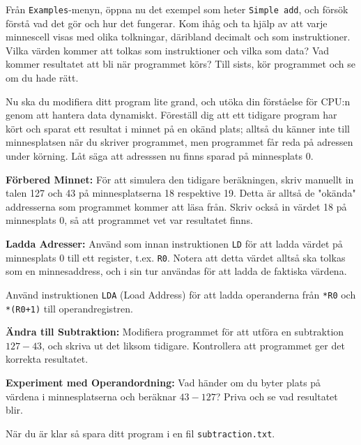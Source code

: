 \begin{Datorarbete}
    \item {} Från \texttt{Examples}-menyn, öppna nu det exempel som heter \texttt{Simple~add}, och försök förstå vad det gör och hur det fungerar. Kom ihåg och ta hjälp av att varje minnescell visas med olika tolkningar, däribland decimalt och som instruktioner. Vilka värden kommer att tolkas som instruktioner och vilka som data? Vad kommer resultatet att bli när programmet körs? Till sists, kör programmet och se om du hade rätt.
    
    \item {} Nu ska du modifiera ditt program lite grand, och utöka din förståelse för CPU:n genom att hantera data dynamiskt. Föreställ dig att ett tidigare program har kört och sparat ett resultat i minnet på en okänd plats; alltså du känner inte till minnesplatsen när du skriver programmet, men programmet får reda på adressen under körning. Låt säga att adresssen nu finns sparad på minnesplats 0.

    \begin{Deluppgifter}
        \item \textbf{Förbered Minnet:} För att simulera den tidigare beräkningen, skriv manuellt in talen 127 och 43 på minnesplatserna 18 respektive 19. Detta är alltså de "okända" addresserna som programmet kommer att läsa från. Skriv också in värdet 18 på minnesplats 0, så att programmet vet var resultatet finns.
        \item \textbf{Ladda Adresser:} Använd som innan instruktionen \texttt{LD} för att ladda värdet på minnesplats 0 till ett register, t.ex. \texttt{R0}. Notera att detta värdet alltså ska tolkas som en minnesaddress, och i sin tur användas för att ladda de faktiska värdena.
        \item Använd instruktionen \texttt{LDA} (Load Address) för att ladda operanderna från \texttt{*R0} och \texttt{*(R0+1)} till operandregistren.
        \item \textbf{Ändra till Subtraktion:} Modifiera programmet för att utföra en subtraktion \(127-43\), och skriva ut det liksom tidigare. Kontrollera att programmet ger det korrekta resultatet.
        \item \textbf{Experiment med Operandordning:} Vad händer om du byter plats på värdena i minnesplatserna och beräknar \(43-127\)? Priva och se vad resultatet blir.
    \end{Deluppgifter}

    När du är klar så spara ditt program i en fil \texttt{subtraction.txt}.


\end{Datorarbete}
